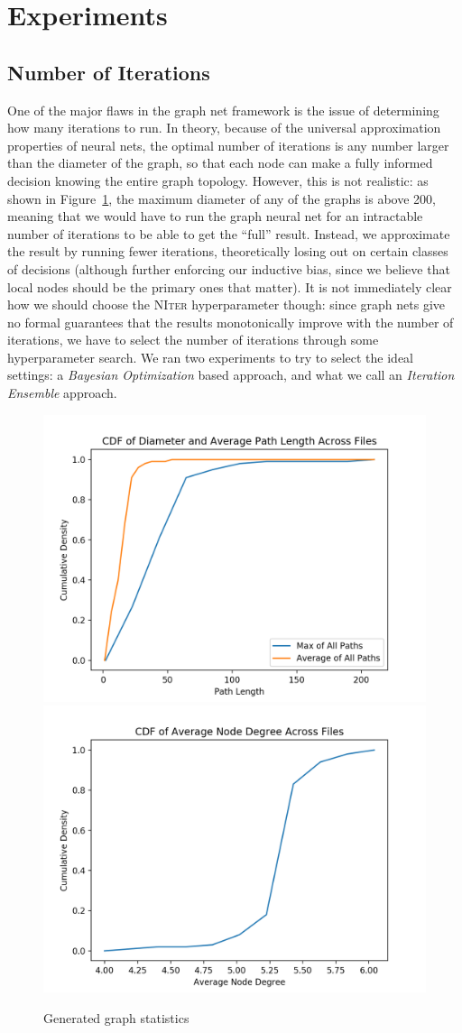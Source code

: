 \section{Experiments}
\label{sec:experiments}

\subsection{Number of Iterations}
One of the major flaws in the graph net framework is the issue of determining how many iterations to run.
In theory, because of the universal approximation properties of neural nets, the optimal number of iterations is any number larger than the diameter of the graph, so that each node can make a fully informed decision knowing the entire graph topology.
However, this is not realistic: as shown in Figure~\ref{fig:dataset-graph-stats}, the maximum diameter of any of the graphs is above 200, meaning that we would have to run the graph neural net for an intractable number of iterations to be able to get the ``full'' result.
Instead, we approximate the result by running fewer iterations, theoretically losing out on certain classes of decisions (although further enforcing our inductive bias, since we believe that local nodes should be the primary ones that matter).
It is not immediately clear how we should choose the \textsc{NIter} hyperparameter though: since graph nets give no formal guarantees that the results monotonically improve with the number of iterations, we have to select the number of iterations through some hyperparameter search.
We ran two experiments to try to select the ideal settings: a \emph{Bayesian Optimization} based approach, and what we call an \emph{Iteration Ensemble} approach.

\begin{figure}
  \centering
  \includegraphics[width=0.49\linewidth]{img/diameter}
  \includegraphics[width=0.49\linewidth]{img/node_degree}
  \caption{Generated graph statistics}
  \label{fig:dataset-graph-stats}
\end{figure}


